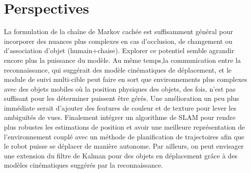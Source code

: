 \section{Perspectives} 
 La formulation de la chaîne de Markov cachée est suffisamment général pour incorporer des nuances plus complexes en cas d'occlusion, de changement ou d'association d'objet (humain+chaise). Explorer ce potentiel semble agrandir encore plus la puissance du modèle. Au même temps,la communication entre la reconnaissance, qui suggérait des modèle cinématiques de déplacement, et le module de suivi multi-cible peut faire en sort que environnements plus complexes avec des objets mobiles où la position physiques des objets, des fois, n'est pas suffisant pour les déterminer puissent être gérés. Une amélioration un peu plus immédiate serait d'ajouter des features de couleur et de texture pour lever les ambiguïtés de vues.  Finalement intégrer un algorithme de SLAM pour rendre plus robustes les estimations de position et avoir une meilleure représentation de l'environnement couplé avec un méthode de planification de trajectoires afin que le robot puisse se déplacer de manière autonome. Par ailleurs, on peut envisager une extension du filtre de Kalman pour des objets en déplacement grâce à des modèles cinématiques suggérés par la reconnaissance.






